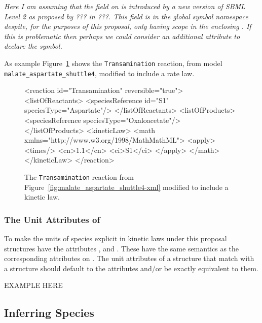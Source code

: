 \documentclass{cekarticle}
\begin{document}
\emph{Here I am assuming that the  field on  is introduced by a
new version of SBML Level 2 as proposed by ??? in ???. This  field is in the global symbol
namespace despite, for the purposes of this proposal, only having scope in the enclosing
.  If this is problematic then perhaps we could consider an additional attribute to
declare the symbol.}

As example Figure~\ref{fig:Transamination-xml} shows the \texttt{Transamination} reaction, from model
\texttt{malate\_aspartate\_shuttle4}, modified to include a rate law.

\begin{figure}[h]
\begin{example}
<reaction id="Transamination" reversible="true">
    <listOfReactants>
        <speciesReference id="S1" speciesType="Aspartate"/>
    </listOfReactants>
    <listOfProducts>
        <speciesReference speciesType="Oxaloacetate"/>
    </listOfProducts>
    <kineticLaw>
        <math xmlns="http://www.w3.org/1998/MathMathML">
            <apply>
                <times/>
                <cn>1.1</cn>
                <ci>S1</ci>
            </apply> 
        </math>
    </kineticLaw>
</reaction>
\end{example}
\caption{The \texttt{Transamination} reaction from
Figure~\ref{fig:malate_aspartate_shuttle4-xml} modified to include a kinetic law.} 
\label{fig:Transamination-xml}
\end{figure}

\subsubsection{The Unit Attributes of }

To make the units of species explicit in kinetic laws under this proposal 
 structures have the attributes ,
 and .  These have the same semantics as
the corresponding attributes on .  The unit attributes of a
 structure that match with a  structure should
default to the  attributes and/or be exactly equivalent to them.  

EXAMPLE HERE

\subsection{Inferring Species}
\end{document}
